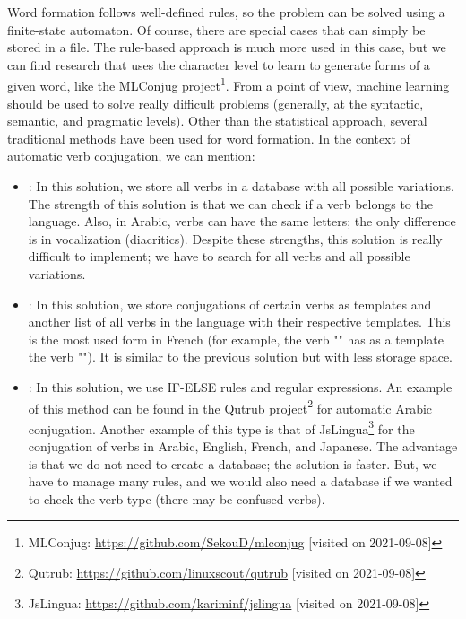 \documentclass{KBook}
\begin{document}
Word formation follows well-defined rules, so the problem can be solved using a finite-state automaton. 
Of course, there are special cases that can simply be stored in a file. 
The rule-based approach is much more used in this case, but we can find research that uses the character level to learn to generate forms of a given word, like the MLConjug project\footnote{MLConjug: \url{https://github.com/SekouD/mlconjug} [visited on 2021-09-08]}. 
From a point of view, machine learning should be used to solve really difficult problems (generally, at the syntactic, semantic, and pragmatic levels). 
Other than the statistical approach, several traditional methods have been used for word formation. 
In the context of automatic verb conjugation, we can mention:
\begin{itemize}
	\item {}: In this solution, we store all verbs in a database with all possible variations. 
	The strength of this solution is that we can check if a verb belongs to the language. 
	Also, in Arabic, verbs can have the same letters; the only difference is in vocalization (diacritics).
	Despite these strengths, this solution is really difficult to implement; we have to search for all verbs and all possible variations. 
	
	\item {}: In this solution, we store conjugations of certain verbs as templates and another list of all verbs in the language with their respective templates.
	This is the most used form in French (for example, the verb "" has as a template the verb ""). 
	It is similar to the previous solution but with less storage space.
	
	\item {}: In this solution, we use IF-ELSE rules and regular expressions.
	An example of this method can be found in the Qutrub project\footnote{Qutrub: \url{https://github.com/linuxscout/qutrub} [visited on 2021-09-08]} for automatic Arabic conjugation.  
	Another example of this type is that of JsLingua\footnote{JsLingua: \url{https://github.com/kariminf/jslingua} [visited on 2021-09-08]} for the conjugation of verbs in Arabic, English, French, and Japanese. 
	The advantage is that we do not need to create a database; the solution is faster. 
	But, we have to manage many rules, and we would also need a database if we wanted to check the verb type (there may be confused verbs).
\end{itemize}
\end{document}
